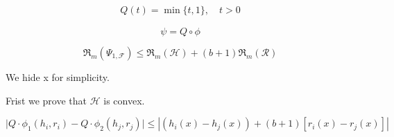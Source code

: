 \documentclass{article}
\begin{document}


\begin{align}
    Q(t) = \min \{t, 1 \} ,\quad {t>0}
\end{align}


\begin{equation}
    \psi = Q \circ \phi
\end{equation}






$$
    \mathfrak{R}_{m}\left(\Psi_{1, \mathcal{F}}\right) \leq \mathfrak{R}_{m}(\mathcal{H})+(b+1) \Re_{m}(\mathcal{R})
$$



We hide x for simplicity.


Frist we prove that $\mathcal{H}$ is convex.

\begin{equation}
    \mid Q \cdot \phi_{1}\left(h_{i}, r_{i}\right) -Q \cdot \phi_{2}\left(h_{j}, r_{j}\right) \mid \leq  |\left(h_{i}(x)-h_{j}(x)\right)+(b+1)\left[r_{i}(x)-r_{j}(x)\right] |
\end{equation}
\end{document}

